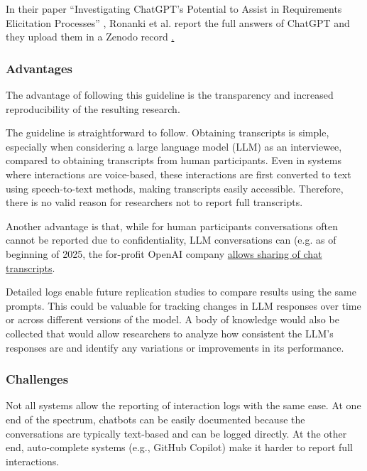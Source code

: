 In their paper ``Investigating ChatGPT's Potential to Assist in Requirements Elicitation Processes'' \cite{ronanki2023investigating}, Ronanki et al. report the full answers of ChatGPT and they upload them in a Zenodo record \href{https://zenodo.org/records/8124936}. 



\subsubsection{Advantages}

The advantage of following this guideline is the transparency and increased reproducibility of the resulting research. 

The guideline is straightforward to follow. Obtaining transcripts is simple, especially when considering a large language model (LLM) as an interviewee, compared to obtaining transcripts from human participants. Even in systems where interactions are voice-based, these interactions are first converted to text using speech-to-text methods, making transcripts easily accessible. Therefore, there is no valid reason for researchers not to report full transcripts.

Another advantage is that, while for human participants conversations often cannot be reported due to confidentiality, LLM conversations can (e.g. as of beginning of 2025, the for-profit OpenAI company \href{https://openai.com/policies/sharing-publication-policy/}{allows sharing of chat transcripts}.

Detailed logs enable future replication studies to compare results using the same prompts. This could be valuable for tracking changes in LLM responses over time or across different versions of the model. A body of knowledge would also be collected that would allow researchers to analyze how consistent the LLM's responses are and identify any variations or improvements in its performance.



\subsubsection{Challenges}



Not all systems allow the reporting of interaction logs with the same ease. At one end of the spectrum, chatbots can be easily documented because the conversations are typically text-based and can be logged directly. At the other end, auto-complete systems (e.g., GitHub Copilot) make it harder to report full interactions. 


